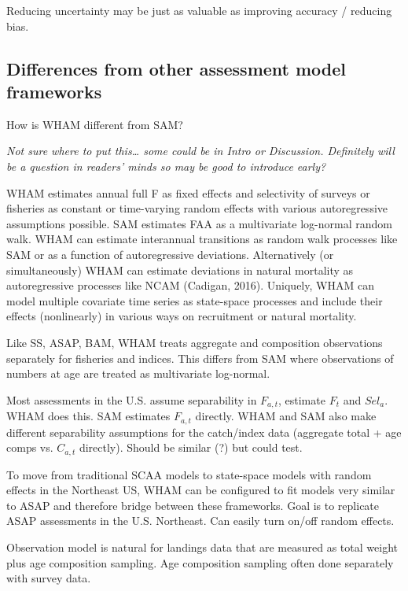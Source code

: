 \documentclass[]{article}
\begin{document}
Reducing uncertainty may be just as valuable as improving accuracy /
reducing bias.

\hypertarget{differences-from-other-assessment-model-frameworks}{%
\subsection{Differences from other assessment model
frameworks}\label{differences-from-other-assessment-model-frameworks}}

How is WHAM different from SAM?

\emph{Not sure where to put this\ldots{} some could be in Intro or
Discussion. Definitely will be a question in readers' minds so may be
good to introduce early?}

WHAM estimates annual full F as fixed effects and selectivity of surveys
or fisheries as constant or time-varying random effects with various
autoregressive assumptions possible. SAM estimates FAA as a multivariate
log-normal random walk. WHAM can estimate interannual transitions as
random walk processes like SAM or as a function of autoregressive
deviations. Alternatively (or simultaneously) WHAM can estimate
deviations in natural mortality as autoregressive processes like NCAM
(Cadigan, 2016). Uniquely, WHAM can model multiple covariate time series
as state-space processes and include their effects (nonlinearly) in
various ways on recruitment or natural mortality.

Like SS, ASAP, BAM, WHAM treats aggregate and composition observations
separately for fisheries and indices. This differs from SAM where
observations of numbers at age are treated as multivariate log-normal.

Most assessments in the U.S. assume separability in \(F_{a,t}\),
estimate \(F_t\) and \(Sel_a\). WHAM does this. SAM estimates
\(F_{a,t}\) directly. WHAM and SAM also make different separability
assumptions for the catch/index data (aggregate total + age comps vs.
\(C_{a,t}\) directly). Should be similar (?) but could test.

To move from traditional SCAA models to state-space models with random
effects in the Northeast US, WHAM can be configured to fit models very
similar to ASAP and therefore bridge between these frameworks. Goal is
to replicate ASAP assessments in the U.S. Northeast. Can easily turn
on/off random effects.

Observation model is natural for landings data that are measured as
total weight plus age composition sampling. Age composition sampling
often done separately with survey data.
\end{document}
